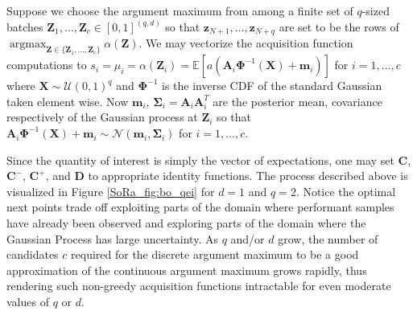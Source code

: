 \documentclass[graybox]{svmult}
\begin{document}
Suppose we choose the argument maximum  from among a finite set of $q$-sized batches $\boldsymbol{Z}_1,\dots,\boldsymbol{Z}_c \in [0,1]^{(q, d)}$ so that $\boldsymbol{z}_{N+1}, \dots,\boldsymbol{z}_{N+q}$ are set to be the rows of $\mathop{\text{argmax}}_{\boldsymbol{Z} \in \{\boldsymbol{Z}_1,\dots,\boldsymbol{Z}_c\}}\alpha(\boldsymbol{Z})$. We may vectorize the acquisition function computations to $s_i = \mu_i = \alpha(\boldsymbol{Z}_i) = \mathbb{E}\left[a\left(\boldsymbol{A}_i\boldsymbol{\Phi}^{-1}(\boldsymbol{X})+\boldsymbol{m}_i\right)\right]$ for $i=1,\dots,c$ where $\boldsymbol{X} \sim \mathcal{U}(0,1)^q$ and $\boldsymbol{\Phi}^{-1}$ is the inverse CDF of the standard Gaussian taken element wise. Now $\boldsymbol{m}_i$, $\boldsymbol{\Sigma}_i = \boldsymbol{A}_i\boldsymbol{A}_i^T$ are the posterior mean, covariance respectively of the Gaussian process at $\boldsymbol{Z}_i$ so that $\boldsymbol{A}_i\boldsymbol{\Phi}^{-1}(\boldsymbol{X})+\boldsymbol{m}_i \sim \mathcal{N}\left(\boldsymbol{m}_i,\boldsymbol{\Sigma}_i\right)$ for $i=1,\dots,c$.

Since the quantity of interest is simply the vector of expectations, one may set $\boldsymbol{C}$, $\boldsymbol{C}^-$, $\boldsymbol{C}^+$, and $\boldsymbol{D}$ to appropriate identity functions. The process described above is visualized in Figure \ref{SoRa_fig:bo_qei} for $d=1$ and $q=2$. Notice the optimal next points trade off exploiting parts of the domain where performant samples have already been observed and  exploring parts of the domain where the Gaussian Process has large uncertainty.  As $q$ and/or $d$ grow, the number of candidates $c$ required for the discrete argument maximum to be a good approximation of the continuous argument maximum grows rapidly, thus rendering such non-greedy acquisition functions intractable for even moderate values of $q$ or $d$.
\end{document}
